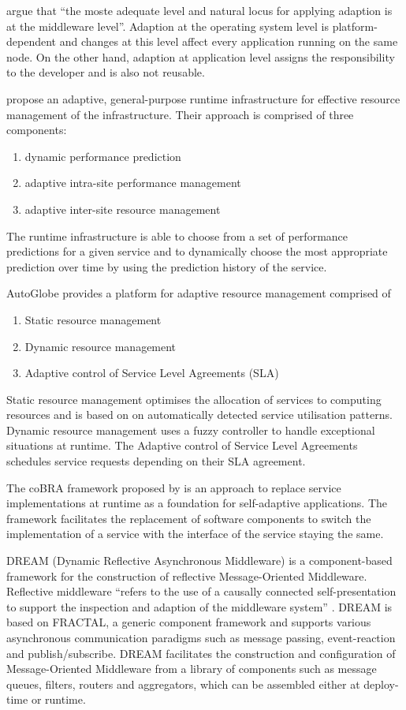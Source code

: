 \citet{Duran-Limon:2004mi} argue that ``the moste adequate level and natural locus for applying adaption is at the middleware level''. Adaption at the operating system level is platform-dependent and changes at this level affect every application running on the same node. On the other hand, adaption at application level assigns the responsibility to the developer and is also not reusable.

\citet{Lee:2009vn} propose an adaptive, general-purpose runtime infrastructure for effective resource management of the infrastructure. Their approach is comprised of three components:
\begin{enumerate}
	\item dynamic performance prediction
	\item adaptive intra-site performance management
	\item adaptive inter-site resource management
\end{enumerate}

The runtime infrastructure is able to choose from a set of performance predictions for a given service and to dynamically choose the most appropriate prediction over time by using the prediction history of the service.

AutoGlobe \citep{Gmach:2008vo} provides a platform for adaptive resource management comprised of 
\begin{enumerate}
	\item Static resource management
	\item Dynamic resource management
	\item Adaptive control of Service Level Agreements (SLA)
\end{enumerate}
Static resource management optimises the allocation of services to computing resources and is based on on automatically detected service utilisation patterns. Dynamic resource management uses a fuzzy controller to handle exceptional situations at runtime. The Adaptive control of Service Level Agreements schedules service requests depending on their SLA agreement.

The coBRA framework proposed by \citet{Irmert:2008nx} is an approach to replace service implementations at runtime as a foundation for self-adaptive applications. The framework facilitates the replacement of software components to switch the implementation of a service with the interface of the service staying the same.

DREAM (Dynamic Reflective Asynchronous Middleware) \citep{Leclercq:2004ly} is a component-based framework for the construction of reflective Message-Oriented Middleware. Reflective middleware ``refers to the use of a causally connected self-presentation to support the inspection and adaption of the middleware system'' \citep{Kon:2002fu}. DREAM is based on FRACTAL, a generic component framework and supports various asynchronous communication paradigms such as message passing, event-reaction and publish/subscribe. DREAM facilitates the construction and configuration of Message-Oriented Middleware from a library of components such as message queues, filters, routers and aggregators, which can be assembled either at deploy-time or runtime.
